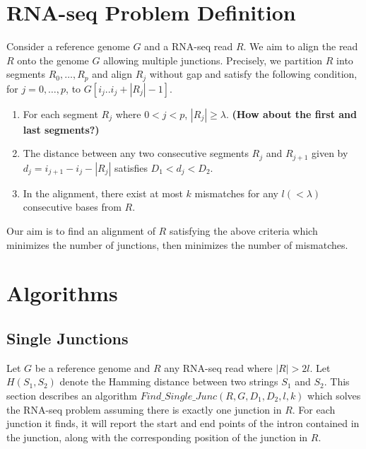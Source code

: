 \documentclass{article}
\begin{document}
\section{RNA-seq Problem Definition}
Consider a reference genome $G$ and a RNA-seq read $R$. We aim to align the read $R$ onto the genome $G$ allowing multiple junctions. Precisely,
we partition $R$ into segments $R_0, \ldots, R_p$
and align $R_j$
without gap and satisfy the following condition, for $j=0, \ldots, p$, to $G[i_j..i_j+|R_j|-1]$. 
\begin{enumerate}
	\item For each segment $R_j$ where $0<j<p$, $|R_j|\geq\lambda$. {\bf (How about the first and last segments?)}
	\item The distance between any two consecutive segments $R_j$ and $R_{j+1}$ given by $d_j = i_{j+1} - i_{j} - |R_j|$ satisfies $D_1<d_j<D_2$.
	\item In the alignment, there exist at most $k$ mismatches for any $l(<\lambda)$ consecutive bases from $R$.
\end{enumerate}
Our aim is to find an alignment of $R$ satisfying
the above criteria which minimizes the number of junctions,
then minimizes the number of mismatches. 


\section{Algorithms}
\subsection{Single Junctions}
Let $G$ be a reference genome and $R$ any RNA-seq read where $|R|>2l$. Let $H(S_1,S_2)$ denote the Hamming distance between two strings $S_1$ and $S_2$.
This section describes an algorithm $Find\_Single\_Junc(R,G,D_1,D_2,l,k)$
which solves the RNA-seq problem assuming there is exactly one junction in $R$. For each junction it finds, it will report the start and end points of the intron contained in the junction, along with the corresponding position of the junction in $R$. 
\end{document}
